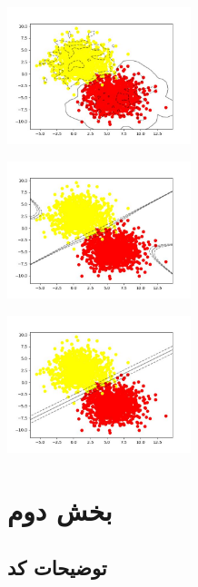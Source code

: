 \documentclass[12pt,titlepage,a4page , tikz , multi,table , svgnames,xcdraw]{article}
\begin{document}
\begin{center}

 \includegraphics[width=0.4\textwidth]{images/40.jpg}

\end{center}

\begin{center}

 \includegraphics[width=0.4\textwidth]{images/41.jpg}

\end{center}

\begin{center}

 \includegraphics[width=0.4\textwidth]{images/42.jpg}

\end{center}

\newpage

\section{بخش دوم}

\subsection{توضیحات کد}
\end{document}
